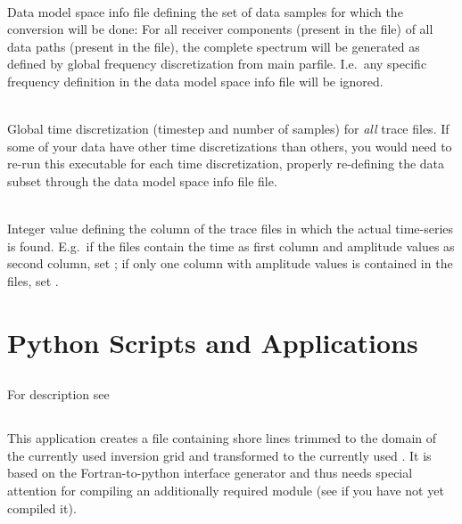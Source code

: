 \textbf{}\\
Data model space info file defining the set of data samples for which the conversion will be done:
For all receiver components (present in the file) of all data paths (present in the file), the 
complete spectrum will be generated as defined by global frequency discretization from main parfile.
I.e.\ any specific frequency definition in the data model space info file will be ignored.

\textbf{}\\
Global time discretization (timestep and number of samples) for \emph{all}  trace files.
If some of your data have other time discretizations than others, you would need to 
re-run this executable for each time discretization, properly re-defining the data subset 
through the data model space info file file.

\textbf{}\\
Integer value defining the column of the  trace files in which the actual time-series
is found. E.g.\ if the files contain the time as first column and amplitude values as second column, set
; if only one column with amplitude values is contained in the files, 
set .

%
\section{Python Scripts and Applications} \label{programs_scripts,sec:py}
%
\subsection{} \label{programs_scripts,sec:py,sec:createdir}
For description see 

\subsection{} \label{programs_scripts,sec:py,sec:shore_lines}
This application creates a  file containing shore lines trimmed to the domain of the
currently used inversion grid and transformed to the currently used .
It is based on the Fortran-to-python interface generator  and thus needs special attention for
compiling an additionally required module (see  if you have
not yet compiled it).

